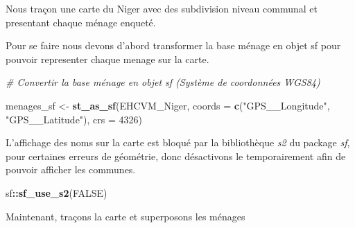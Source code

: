 \documentclass[
]{article}
\newenvironment{Shaded}{\begin{snugshade}}{\end{snugshade}}
\newcommand{\AttributeTok}[1]{\textcolor[rgb]{0.13,0.29,0.53}{#1}}
\newcommand{\CommentTok}[1]{\textcolor[rgb]{0.56,0.35,0.01}{\textit{#1}}}
\newcommand{\ConstantTok}[1]{\textcolor[rgb]{0.56,0.35,0.01}{#1}}
\newcommand{\DecValTok}[1]{\textcolor[rgb]{0.00,0.00,0.81}{#1}}
\newcommand{\FunctionTok}[1]{\textcolor[rgb]{0.13,0.29,0.53}{\textbf{#1}}}
\newcommand{\NormalTok}[1]{#1}
\newcommand{\OtherTok}[1]{\textcolor[rgb]{0.56,0.35,0.01}{#1}}
\newcommand{\SpecialCharTok}[1]{\textcolor[rgb]{0.81,0.36,0.00}{\textbf{#1}}}
\newcommand{\StringTok}[1]{\textcolor[rgb]{0.31,0.60,0.02}{#1}}
\begin{document}
Nous traçon une carte du Niger avec des subdivision niveau communal et
presentant chaque ménage enqueté.

Pour se faire nous devons d'abord transformer la base ménage en objet sf
pour pouvoir representer chaque menage sur la carte.

\begin{Shaded}
\begin{Highlighting}[]
\CommentTok{\# Convertir la base ménage en objet sf (Système de coordonnées WGS84)}

\NormalTok{menages\_sf }\OtherTok{\textless{}{-}} \FunctionTok{st\_as\_sf}\NormalTok{(EHCVM\_Niger, }\AttributeTok{coords =} \FunctionTok{c}\NormalTok{(}\StringTok{"GPS\_\_Longitude"}\NormalTok{, }\StringTok{"GPS\_\_Latitude"}\NormalTok{), }\AttributeTok{crs =} \DecValTok{4326}\NormalTok{)}
\end{Highlighting}
\end{Shaded}

L'affichage des noms sur la carte est bloqué par la bibliothèque
\emph{s2} du package \emph{sf}, pour certaines erreurs de géométrie,
donc désactivons le temporairement afin de pouvoir afficher les
communes.

\begin{Shaded}
\begin{Highlighting}[]
\NormalTok{sf}\SpecialCharTok{::}\FunctionTok{sf\_use\_s2}\NormalTok{(}\ConstantTok{FALSE}\NormalTok{) }
\end{Highlighting}
\end{Shaded}

Maintenant, traçons la carte et superposons les ménages
\end{document}
